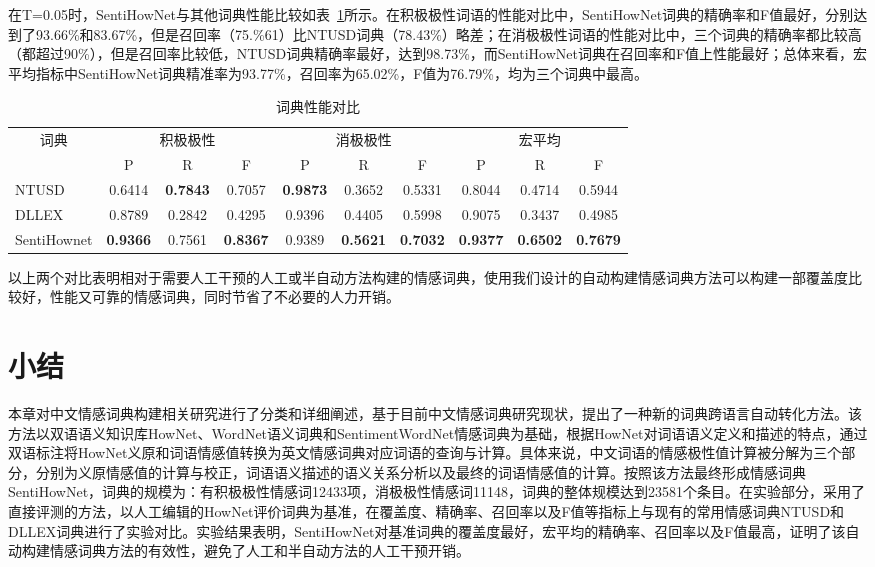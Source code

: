 在T=0.05时，SentiHowNet与其他词典性能比较如表~\ref{tab2-3}所示。在积极极性词语的性能对比中，SentiHowNet词典的精确率和F值最好，分别达到了93.66\%和83.67\%，但是召回率（75.\%61）比NTUSD词典（78.43\%）略差；在消极极性词语的性能对比中，三个词典的精确率都比较高（都超过90\%），但是召回率比较低，NTUSD词典精确率最好，达到98.73\%，而SentiHowNet词典在召回率和F值上性能最好；总体来看，宏平均指标中SentiHowNet词典精准率为93.77\%，召回率为65.02\%，F值为76.79\%，均为三个词典中最高。
\begin{table}[htp]
\centering
\caption{词典性能对比}
\label{tab2-3}
\begin{tabular}{|l|c|c|c|c|c|c|c|c|c|}
\hline
\multicolumn{1}{|c|}{\multirow{2}{*}{词典}} & \multicolumn{3}{c|}{积极极性} & \multicolumn{3}{c|}{消极极性} & \multicolumn{3}{c|}{宏平均} \\ \cline{2-10} 
\multicolumn{1}{|c|}{} & P & R & F & P & R & F & P & R & F \\ \hline
NTUSD & 0.6414 & \textbf{0.7843} & 0.7057 & \textbf{0.9873} & 0.3652 & 0.5331 & 0.8044 & 0.4714 & 0.5944 \\ \hline
DLLEX & 0.8789 & 0.2842 & 0.4295 & 0.9396 & 0.4405 & 0.5998 & 0.9075 & 0.3437 & 0.4985 \\ \hline
SentiHownet & \textbf{0.9366} & 0.7561 & \textbf{0.8367} & 0.9389 & \textbf{0.5621} & \textbf{0.7032} & \textbf{0.9377} & \textbf{0.6502} & \textbf{0.7679} \\ \hline
\end{tabular}
\end{table}

以上两个对比表明相对于需要人工干预的人工或半自动方法构建的情感词典，使用我们设计的自动构建情感词典方法可以构建一部覆盖度比较好，性能又可靠的情感词典，同时节省了不必要的人力开销。

\section{小结}
本章对中文情感词典构建相关研究进行了分类和详细阐述，基于目前中文情感词典研究现状，提出了一种新的词典跨语言自动转化方法。该方法以双语语义知识库HowNet、WordNet语义词典和SentimentWordNet情感词典为基础，根据HowNet对词语语义定义和描述的特点，通过双语标注将HowNet义原和词语情感值转换为英文情感词典对应词语的查询与计算。具体来说，中文词语的情感极性值计算被分解为三个部分，分别为义原情感值的计算与校正，词语语义描述的语义关系分析以及最终的词语情感值的计算。按照该方法最终形成情感词典SentiHowNet，词典的规模为：有积极极性情感词12433项，消极极性情感词11148，词典的整体规模达到23581个条目。在实验部分，采用了直接评测的方法，以人工编辑的HowNet评价词典为基准，在覆盖度、精确率、召回率以及F值等指标上与现有的常用情感词典NTUSD和DLLEX词典进行了实验对比。实验结果表明，SentiHowNet对基准词典的覆盖度最好，宏平均的精确率、召回率以及F值最高，证明了该自动构建情感词典方法的有效性，避免了人工和半自动方法的人工干预开销。
\newpage 
\mbox{} 
\newpage